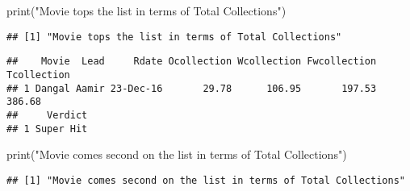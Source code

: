 \documentclass[
]{article}
\newenvironment{Shaded}{\begin{snugshade}}{\end{snugshade}}
\newcommand{\CommentTok}[1]{\textcolor[rgb]{0.56,0.35,0.01}{\textit{#1}}}
\newcommand{\FunctionTok}[1]{\textcolor[rgb]{0.00,0.00,0.00}{#1}}
\newcommand{\NormalTok}[1]{#1}
\newcommand{\OtherTok}[1]{\textcolor[rgb]{0.56,0.35,0.01}{#1}}
\newcommand{\SpecialCharTok}[1]{\textcolor[rgb]{0.00,0.00,0.00}{#1}}
\newcommand{\StringTok}[1]{\textcolor[rgb]{0.31,0.60,0.02}{#1}}
\begin{document}
\begin{Shaded}
\begin{Highlighting}[]
\FunctionTok{print}\NormalTok{(}\StringTok{"Movie tops the list in terms of Total Collections"}\NormalTok{)}
\end{Highlighting}
\end{Shaded}

\begin{verbatim}
## [1] "Movie tops the list in terms of Total Collections"
\end{verbatim}

\begin{Shaded}
\end{Shaded}

\begin{verbatim}
##    Movie  Lead     Rdate Ocollection Wcollection Fwcollection Tcollection
## 1 Dangal Aamir 23-Dec-16       29.78      106.95       197.53      386.68
##     Verdict
## 1 Super Hit
\end{verbatim}

\begin{Shaded}
\begin{Highlighting}[]
\FunctionTok{print}\NormalTok{(}\StringTok{"Movie comes second on the list in terms of Total Collections"}\NormalTok{)}
\end{Highlighting}
\end{Shaded}

\begin{verbatim}
## [1] "Movie comes second on the list in terms of Total Collections"
\end{verbatim}

\begin{Shaded}
\end{Shaded}
\end{document}
